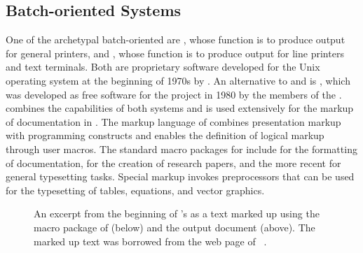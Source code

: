 \subsection{Batch-oriented Systems}
One of the archetypal batch-oriented  are %
, whose function is to produce output for general
printers, and %
, whose function is to
produce output for line printers and text terminals. Both are proprietary
software developed for the Unix operating system at the beginning of 1970s by
. An alternative to  and  is
, which was
developed as free software for the  project in 1980 by the members
of the .  combines the capabilities of both systems
and is used extensively for the markup of documentation in \Unices. The
markup language of  combines presentation
markup with programming constructs and enables the
definition of logical markup through user macros. The
standard macro packages for  include  for the
 formatting of documentation,
  for the creation
of research papers, and the more recent 
 for general typesetting tasks.
Special markup invokes preprocessors that can be used for the typesetting of
tables, equations, and vector graphics.

\begin{figure}
  \vspace{.9em}
  \caption{An excerpt from the beginning of 's
     as a
    text marked up using the  macro package of 
    (below) and the output document (above). The marked up text was borrowed
    from the web page of ~\cite{schaffter15}.}
  \label{fig:poe}
\end{figure}


